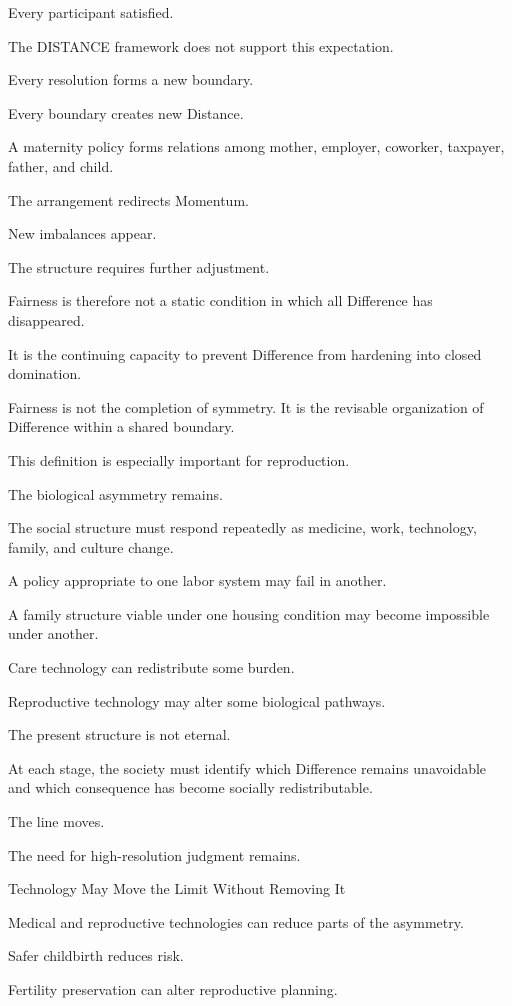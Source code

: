 Every participant satisfied.

The DISTANCE framework does not support this expectation.

Every resolution forms a new boundary.

Every boundary creates new Distance.

A maternity policy forms relations among mother, employer, coworker, taxpayer, father, and child.

The arrangement redirects Momentum.

New imbalances appear.

The structure requires further adjustment.

Fairness is therefore not a static condition in which all Difference has disappeared.

It is the continuing capacity to prevent Difference from hardening into closed domination.

Fairness is not the completion of symmetry. It is the revisable organization of Difference within a shared boundary.

This definition is especially important for reproduction.

The biological asymmetry remains.

The social structure must respond repeatedly as medicine, work, technology, family, and culture change.

A policy appropriate to one labor system may fail in another.

A family structure viable under one housing condition may become impossible under another.

Care technology can redistribute some burden.

Reproductive technology may alter some biological pathways.

The present structure is not eternal.

At each stage, the society must identify which Difference remains unavoidable and which consequence has become socially redistributable.

The line moves.

The need for high-resolution judgment remains.

Technology May Move the Limit Without Removing It

Medical and reproductive technologies can reduce parts of the asymmetry.

Safer childbirth reduces risk.

Fertility preservation can alter reproductive planning.

